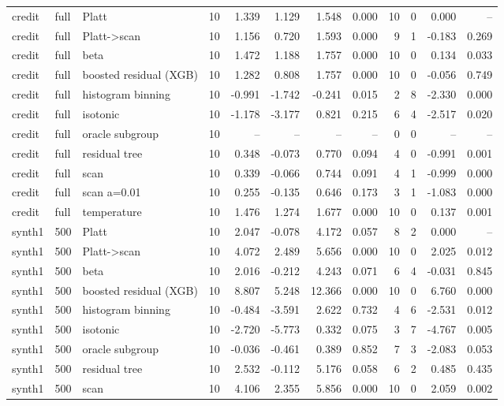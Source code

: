\begin{tabular}{lllrrrrrrrrr}
credit & full & Platt & 10 & 1.339 & 1.129 & 1.548 & 0.000 & 10 & 0 & 0.000 & -- \\
credit & full & Platt->scan & 10 & 1.156 & 0.720 & 1.593 & 0.000 & 9 & 1 & -0.183 & 0.269 \\
credit & full & beta & 10 & 1.472 & 1.188 & 1.757 & 0.000 & 10 & 0 & 0.134 & 0.033 \\
credit & full & boosted residual (XGB) & 10 & 1.282 & 0.808 & 1.757 & 0.000 & 10 & 0 & -0.056 & 0.749 \\
credit & full & histogram binning & 10 & -0.991 & -1.742 & -0.241 & 0.015 & 2 & 8 & -2.330 & 0.000 \\
credit & full & isotonic & 10 & -1.178 & -3.177 & 0.821 & 0.215 & 6 & 4 & -2.517 & 0.020 \\
credit & full & oracle subgroup & 10 & -- & -- & -- & -- & 0 & 0 & -- & -- \\
credit & full & residual tree & 10 & 0.348 & -0.073 & 0.770 & 0.094 & 4 & 0 & -0.991 & 0.001 \\
credit & full & scan & 10 & 0.339 & -0.066 & 0.744 & 0.091 & 4 & 1 & -0.999 & 0.000 \\
credit & full & scan a=0.01 & 10 & 0.255 & -0.135 & 0.646 & 0.173 & 3 & 1 & -1.083 & 0.000 \\
credit & full & temperature & 10 & 1.476 & 1.274 & 1.677 & 0.000 & 10 & 0 & 0.137 & 0.001 \\
synth1 & 500 & Platt & 10 & 2.047 & -0.078 & 4.172 & 0.057 & 8 & 2 & 0.000 & -- \\
synth1 & 500 & Platt->scan & 10 & 4.072 & 2.489 & 5.656 & 0.000 & 10 & 0 & 2.025 & 0.012 \\
synth1 & 500 & beta & 10 & 2.016 & -0.212 & 4.243 & 0.071 & 6 & 4 & -0.031 & 0.845 \\
synth1 & 500 & boosted residual (XGB) & 10 & 8.807 & 5.248 & 12.366 & 0.000 & 10 & 0 & 6.760 & 0.000 \\
synth1 & 500 & histogram binning & 10 & -0.484 & -3.591 & 2.622 & 0.732 & 4 & 6 & -2.531 & 0.012 \\
synth1 & 500 & isotonic & 10 & -2.720 & -5.773 & 0.332 & 0.075 & 3 & 7 & -4.767 & 0.005 \\
synth1 & 500 & oracle subgroup & 10 & -0.036 & -0.461 & 0.389 & 0.852 & 7 & 3 & -2.083 & 0.053 \\
synth1 & 500 & residual tree & 10 & 2.532 & -0.112 & 5.176 & 0.058 & 6 & 2 & 0.485 & 0.435 \\
synth1 & 500 & scan & 10 & 4.106 & 2.355 & 5.856 & 0.000 & 10 & 0 & 2.059 & 0.002 \\

\end{tabular}
